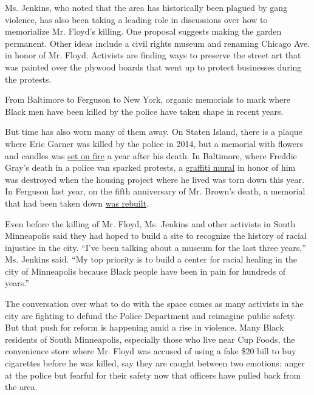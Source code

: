 Ms. Jenkins, who noted that the area has historically been plagued by
gang violence, has also been taking a leading role in discussions over
how to memorialize Mr. Floyd's killing. One proposal suggests making the
garden permanent. Other ideas include a civil rights museum and renaming
Chicago Ave. in honor of Mr. Floyd. Activists are finding ways to
preserve the street art that was painted over the plywood boards that
went up to protect businesses during the protests.

From Baltimore to Ferguson to New York, organic memorials to mark where
Black men have been killed by the police have taken shape in recent
years.

But time has also worn many of them away. On Staten Island, there is a
plaque where Eric Garner was killed by the police in 2014, but a
memorial with flowers and candles was
\href{http://www.mtv.com/news/2054937/eric-garner-memorial-burned/}{set
on fire} a year after his death. In Baltimore, where Freddie Gray's
death in a police van sparked protests, a
\href{https://wtop.com/baltimore/2020/04/housing-project-where-freddie-gray-lived-being-torn-down/}{graffiti
mural} in honor of him was destroyed when the housing project where he
lived was torn down this year. In Ferguson last year, on the fifth
anniversary of Mr. Brown's death, a memorial that had been taken down
\href{https://www.stltoday.com/news/local/crime-and-courts/photos-michael-brown-memorial-rebuilt-in-ferguson/collection_61703922-5214-5cc4-98a6-b8fb6b80ed59.html\#1}{was
rebuilt}.

Even before the killing of Mr. Floyd, Ms. Jenkins and other activists in
South Minneapolis said they had hoped to build a site to recognize the
history of racial injustice in the city. ``I've been talking about a
museum for the last three years,'' Ms. Jenkins said. ``My top priority
is to build a center for racial healing in the city of Minneapolis
because Black people have been in pain for hundreds of years.''

The conversation over what to do with the space comes as many activists
in the city are fighting to defund the Police Department and reimagine
public safety. But that push for reform is happening amid a rise in
violence. Many Black residents of South Minneapolis, especially those
who live near Cup Foods, the convenience store where Mr. Floyd was
accused of using a fake \$20 bill to buy cigarettes before he was
killed, say they are caught between two emotions: anger at the police
but fearful for their safety now that officers have pulled back from the
area.

